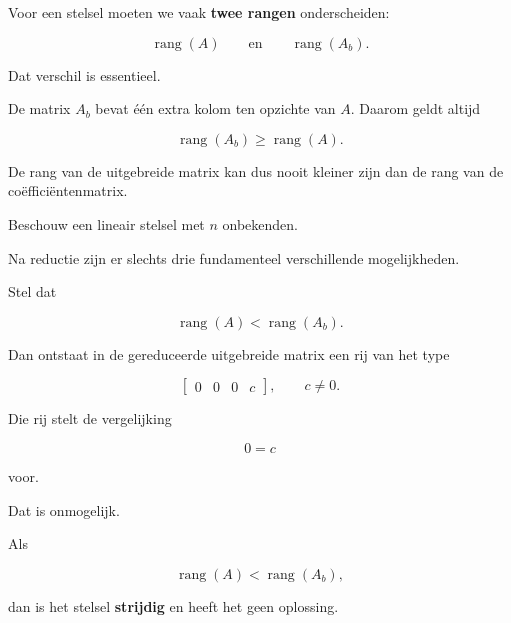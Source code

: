 \documentclass{ximera}
\begin{document}
\begin{opmerking}[Belangrijk]

Voor een stelsel moeten we vaak \textbf{twee rangen} onderscheiden:

\[
\operatorname{rang}(A)
\qquad\text{en}\qquad
\operatorname{rang}(A_b).
\]

Dat verschil is essentieel.

De matrix \(A_b\) bevat één extra kolom ten opzichte van \(A\).
Daarom geldt altijd

\[
\operatorname{rang}(A_b)\geq \operatorname{rang}(A).
\]

De rang van de uitgebreide matrix kan dus nooit kleiner zijn dan
de rang van de coëfficiëntenmatrix.
\end{opmerking}





Beschouw een lineair stelsel met \(n\) onbekenden.

Na reductie zijn er slechts drie fundamenteel verschillende mogelijkheden.



Stel dat

\[
\operatorname{rang}(A)<\operatorname{rang}(A_b).
\]

Dan ontstaat in de gereduceerde uitgebreide matrix een rij van het type

\[
\left[
\begin{array}{ccc|c}
0&0&0&c
\end{array}
\right],
\qquad c\neq 0.
\]

Die rij stelt de vergelijking

\[
0=c
\]

voor.

Dat is onmogelijk.

\begin{eigenschap}
Als

\[
\operatorname{rang}(A)<\operatorname{rang}(A_b),
\]

dan is het stelsel \textbf{strijdig} en heeft het geen oplossing.
\end{eigenschap}
\end{document}

